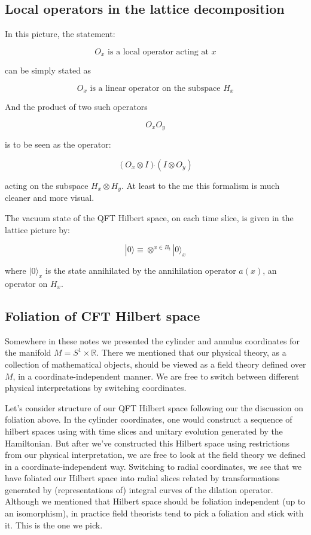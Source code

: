 \subsection{ Local operators in the lattice decomposition}

In this picture, the statement:

$$O_x \text{ is a local operator acting at } x$$

can be simply stated as

$$O_x \text{ is a linear operator on the subspace } H_x$$

And the product of two such operators

$$O_xO_y$$

is to be seen as the operator:

$$(O_x \otimes I ) \dot{}(I \otimes O_y) $$

acting on the subspace $H_x \otimes H_y$. At least to the me this formalism is much cleaner and more visual.


The vacuum state of the QFT Hilbert space, on each time slice, is given in the lattice picture by:

$$|0\rangle \equiv \otimes^{x \in B_t}|0\rangle_x$$

where $|0\rangle_x$ is the state annihilated by the annihilation  operator $a(x)$, an operator on $H_x$.

\subsection{ Foliation of CFT Hilbert space}

Somewhere in these notes we presented the cylinder and annulus coordinates for the manifold $M = S^1 \times \mathbb{R}$. There we mentioned that our physical theory, as a collection of mathematical objects, should be viewed as a field theory defined over $M$, in a coordinate-independent manner. We are free to switch between different physical interpretations by switching coordinates.

Let's consider structure of our QFT Hilbert space following our the discussion on foliation above.  In the cylinder coordinates, one would construct a sequence of hilbert spaces using with time slices and unitary evolution generated by the Hamiltonian. But after we've constructed this Hilbert space using restrictions from our physical interpretation, we are free to look at the field theory we defined in a coordinate-independent way. Switching to radial coordinates, we see that we have foliated our Hilbert space into radial slices related by transformations generated by (representations of) integral curves of the dilation operator. Although we mentioned that Hilbert space should be foliation independent (up to an isomorphism), in practice field theorists tend to pick a foliation and stick with it. This is the one we pick.



